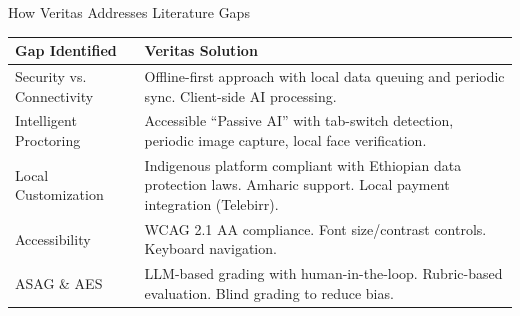 \begin{frame}{How Veritas Addresses Literature Gaps}
    \begin{table}[]
        \centering
        \small
        \begin{tabular}{|p{3.5cm}|p{6.5cm}|}
            \hline
            \textbf{Gap Identified} & \textbf{Veritas Solution} \\
            \hline
            Security vs. Connectivity & Offline-first approach with local data queuing and periodic sync. Client-side AI processing. \\
            \hline
            Intelligent Proctoring & Accessible ``Passive AI'' with tab-switch detection, periodic image capture, local face verification. \\
            \hline
            Local Customization & Indigenous platform compliant with Ethiopian data protection laws. Amharic support. Local payment integration (Telebirr). \\
            \hline
            Accessibility & WCAG 2.1 AA compliance. Font size/contrast controls. Keyboard navigation. \\
            \hline
            ASAG \& AES & LLM-based grading with human-in-the-loop. Rubric-based evaluation. Blind grading to reduce bias. \\
            \hline
        \end{tabular}
    \end{table}
\end{frame}

